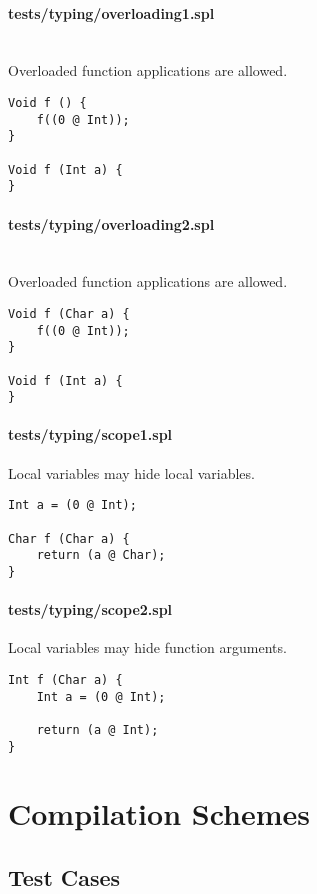 \documentclass[a4paper]{article}
\begin{document}
\paragraph{tests/typing/overloading1.spl}\mbox{}\\ %
Overloaded function applications are allowed.
    \begin{verbatim}
Void f () {
    f((0 @ Int));
}

Void f (Int a) {
}\end{verbatim}

\paragraph{tests/typing/overloading2.spl}\mbox{}\\ %
Overloaded function applications are allowed.
    \begin{verbatim}
Void f (Char a) {
    f((0 @ Int));
}

Void f (Int a) {
}\end{verbatim}

\paragraph{tests/typing/scope1.spl}
Local variables may hide local variables.
    \begin{verbatim}
Int a = (0 @ Int);

Char f (Char a) {
    return (a @ Char);
}\end{verbatim}

\paragraph{tests/typing/scope2.spl}
Local variables may hide function arguments.
    \begin{verbatim}
Int f (Char a) {
    Int a = (0 @ Int);

    return (a @ Int);
}\end{verbatim}

\section{Compilation Schemes}


\subsection{Test Cases}
\end{document}
